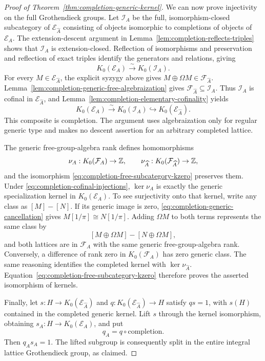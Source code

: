 \begin{proof}[Proof of Theorem~\ref{thm:completion-generic-kernel}]
We can now prove injectivity on the full Grothendieck groups.
Let $\mathcal I_A$ be the full, isomorphism-closed subcategory of
$\mathcal E_{\widehat A}$ consisting of objects isomorphic to
completions of objects of $\mathcal E_A$.  The extension-descent
argument in Lemma~\ref{lem:completion-reflects-triples} shows that
$\mathcal I_A$ is extension-closed.  Reflection of isomorphisms
and preservation and reflection of exact triples identify the
generators and relations, giving
\[
 K_0(\mathcal E_A)\xrightarrow{\sim}K_0(\mathcal I_A).
\]
For every $M\in\mathcal E_{\widehat A}$, the explicit syzygy above
gives $M\oplus\Omega M\in\mathcal F_{\widehat A}$.
Lemma~\ref{lem:completion-generic-free-algebraization} gives
$\mathcal F_{\widehat A}\subseteq\mathcal I_A$.  Thus
$\mathcal I_A$ is cofinal in $\mathcal E_{\widehat A}$, and
Lemma~\ref{lem:completion-elementary-cofinality} yields
\[
 K_0(\mathcal E_A)\xrightarrow{\sim}K_0(\mathcal I_A)
 \hookrightarrow K_0(\mathcal E_{\widehat A}).
\]
This composite is completion.  The argument uses algebraization
only for regular generic type and makes no descent assertion for
an arbitrary completed lattice.

The generic free-group-algebra rank defines homomorphisms
\[
 \nu_A:K_0(\mathcal F_A)\to\mathbb Z,
 \qquad
 \nu_{\widehat A}:K_0(\mathcal F_{\widehat A})\to\mathbb Z,
\]
and the isomorphism
\eqref{eq:completion-free-subcategory-kzero} preserves them.
Under \eqref{eq:completion-cofinal-injections},
$\ker\nu_A$ is exactly the generic specialization kernel in
$K_0(\mathcal E_A)$.  To see surjectivity onto that kernel,
write any class as $[M]-[N]$.  If its generic image is zero,
\eqref{eq:completion-generic-cancellation} gives
$M[1/\pi]\cong N[1/\pi]$.  Adding $\Omega M$ to both terms
represents the same class by
\[
 [M\oplus\Omega M]-[N\oplus\Omega M],
\]
and both lattices are in $\mathcal F_A$ with the same generic
free-group-algebra rank.  Conversely, a difference of rank zero
in $K_0(\mathcal F_A)$ has zero generic class.  The same reasoning
identifies the completed kernel with $\ker\nu_{\widehat A}$.
Equation~\eqref{eq:completion-free-subcategory-kzero} therefore
proves the asserted isomorphism of kernels.

Finally, let $s:H\to K_0(\mathcal E_{\widehat A})$ and
$q:K_0(\mathcal E_{\widehat A})\to H$ satisfy $qs=1$, with
$s(H)$ contained in the completed generic kernel.  Lift $s$
through the kernel isomorphism, obtaining
$s_A:H\to K_0(\mathcal E_A)$, and put
\[
 q_A=q\circ\text{completion}.
\]
Then $q_As_A=1$.  The lifted subgroup is consequently split in
the entire integral lattice Grothendieck group, as claimed.
\end{proof}

